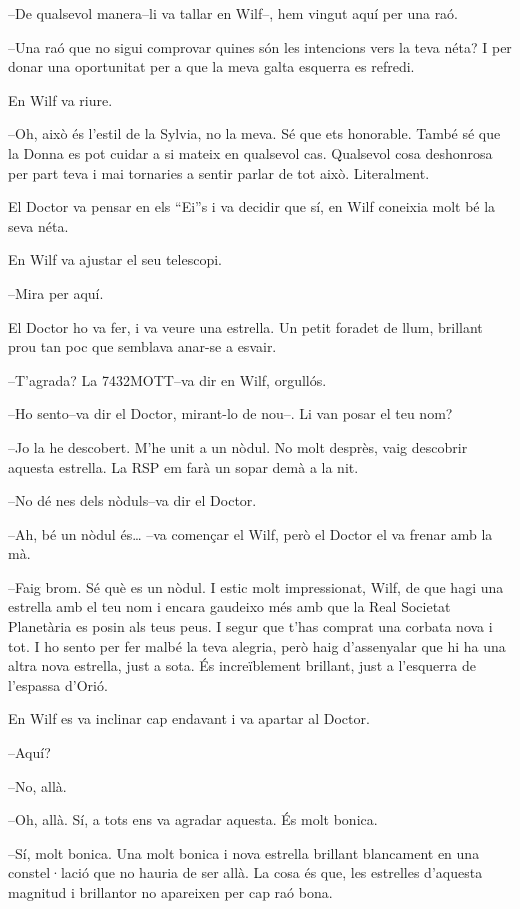 --De qualsevol manera--li va tallar en Wilf--, hem vingut aquí per una
raó.

--Una raó que no sigui comprovar quines són les intencions vers la teva
néta? I per donar una oportunitat per a que la meva galta esquerra es
refredi.

En Wilf va riure.

--Oh, això és l'estil de la Sylvia, no la meva. Sé que ets honorable.
També sé que la Donna es pot cuidar a si mateix en qualsevol cas.
Qualsevol cosa deshonrosa per part teva i mai tornaries a sentir parlar
de tot això. Literalment.

El Doctor va pensar en els ``Ei''s i va decidir que sí, en Wilf coneixia
molt bé la seva néta.

En Wilf va ajustar el seu telescopi.

--Mira per aquí.

El Doctor ho va fer, i va veure una estrella. Un petit foradet de llum,
brillant prou tan poc que semblava anar-se a esvair.

--T'agrada? La 7432MOTT--va dir en Wilf, orgullós.

--Ho sento--va dir el Doctor, mirant-lo de nou--. Li van posar el teu
nom?

--Jo la he descobert. M'he unit a un nòdul. No molt desprès, vaig
descobrir aquesta estrella. La RSP em farà un sopar demà a la nit.

--No dé nes dels nòduls--va dir el Doctor.

--Ah, bé un nòdul és\ldots{} --va començar el Wilf, però el Doctor el va
frenar amb la mà.

--Faig brom. Sé què es un nòdul. I estic molt impressionat, Wilf, de que
hagi una estrella amb el teu nom i encara gaudeixo més amb que la Real
Societat Planetària es posin als teus peus. I segur que t'has comprat
una corbata nova i tot. I ho sento per fer malbé la teva alegria, però
haig d'assenyalar que hi ha una altra nova estrella, just a sota. És
increïblement brillant, just a l'esquerra de l'espassa d'Orió.

En Wilf es va inclinar cap endavant i va apartar al Doctor.

--Aquí?

--No, allà.

--Oh, allà. Sí, a tots ens va agradar aquesta. És molt bonica.

--Sí, molt bonica. Una molt bonica i nova estrella brillant blancament
en una constel·lació que no hauria de ser allà. La cosa és que, les
estrelles d'aquesta magnitud i brillantor no apareixen per cap raó bona.

